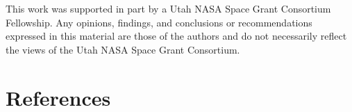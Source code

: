 \documentclass{jpconf}
\begin{document}
\ack 
This work was supported in part by a Utah NASA Space Grant Consortium Fellowship. Any opinions, findings, and conclusions or recommendations expressed in this material are those of the authors and do not necessarily reflect the views of the Utah NASA Space Grant Consortium.

\pagebreak
\section*{References}


\end{document}
